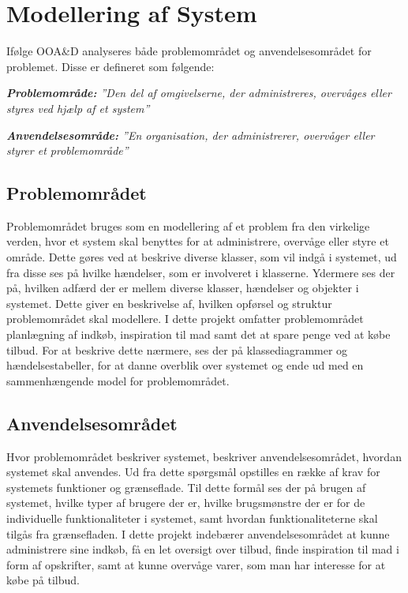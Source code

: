 \section{Modellering af System}
Ifølge OOA\&D\cite[s. 6]{OOA&D2001} analyseres både problemområdet og anvendelsesområdet for problemet.
Disse er defineret som følgende:

\textit{\textbf{Problemområde:} ''Den del af omgivelserne, der administreres, overvåges eller styres ved hjælp af et system''}

\textit{\textbf{Anvendelsesområde:} ''En organisation, der administrerer, overvåger eller styrer et problemområde''}

\subsection{Problemområdet}
Problemområdet bruges som en modellering af et problem fra den virkelige verden, hvor et system skal benyttes for at administrere, overvåge eller styre et område. 
Dette gøres ved at beskrive diverse klasser, som vil indgå i systemet, ud fra disse ses på hvilke hændelser, som er involveret i klasserne.
Ydermere ses der på, hvilken adfærd der er mellem diverse klasser, hændelser og objekter i systemet.
Dette giver en beskrivelse af, hvilken opførsel og struktur problemområdet skal modellere.
I dette projekt omfatter problemområdet planlægning af indkøb, inspiration til mad samt det at spare penge ved at købe tilbud.
For at beskrive dette nærmere, ses der på klassediagrammer og hændelsestabeller, for at danne overblik over systemet og ende ud med en sammenhængende model for problemområdet.
\subsection{Anvendelsesområdet}
Hvor problemområdet beskriver systemet, beskriver anvendelsesområdet, hvordan systemet skal anvendes.
Ud fra dette spørgsmål opstilles en række af krav for systemets funktioner og grænseflade.
Til dette formål ses der på brugen af systemet, hvilke typer af brugere der er, hvilke brugsmønstre der er for de individuelle funktionaliteter i systemet, samt hvordan funktionaliteterne skal tilgås fra grænsefladen.
I dette projekt indebærer anvendelsesområdet at kunne administrere sine indkøb, få en let oversigt over tilbud, finde inspiration til mad i form af opskrifter, samt at kunne overvåge varer, som man har interesse for at købe på tilbud.


